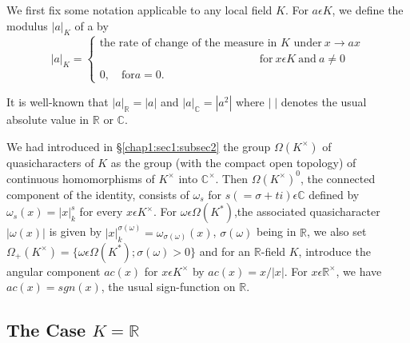 We first fix some notation applicable to any local field $K$. For
 $a\epsilon K$, we define the modulus $|a|_{K}$ of a by 
\begin{equation*}
  |a|_{K}=
  \begin{cases}
    \text{the  rate of change of the measure in $K$ under}~ x \rightarrow
    ax\\ 
    \hspace{6cm}\text{for}~ x\epsilon K ~\text{and}~ a\neq 0\\ 
    0,\quad  \text{for} a=0.
  \end{cases}
\end{equation*}

It is well-known that $|a|_{\mathbb{R}}=|a|$ and
$|a|_{\mathbb{C}}={|a^{2}|}$ where $|\;|$ denotes the usual absolute
value in $\mathbb{R}$ or $\mathbb{C}$. 

 We had introduced in \S \ref{chap1:sec1:subsec2} the group $\Omega(K^\times)$ of
 quasicharacters of $K$ as the group (with the compact open topology) of
 continuous homomorphisms of $K^\times$ into $\mathbb{C}^\times$. Then
 $\Omega(K^\times)^{0}$, the connected component of the identity,
 consists of $\omega_{s}$ for $s(=\sigma+ti)\epsilon \mathbb{C}$
 defined by $\omega_{s}(x)=|x|_{k}^{s}$ for every $x\epsilon
 K^\times$. For $\omega \epsilon \Omega(K^*)$,the associated
 quasicharacter $|\omega(x)|$ is given by
 $|x|_{k}^{\sigma(\omega)}=\omega_{\sigma(\omega)}(x)$, $\sigma(\omega)$
 being in $\mathbb{R}$, we also set $\Omega_{+}(K^\times)=\{\omega
   \epsilon \Omega(K^*); \sigma(\omega) > 0\}$ and for an
 $\mathbb{R}$-field $K$, introduce the angular component $ac(x)$ for
   $x\epsilon K^\times$ by $ac(x)=x/|x|$. For $x \epsilon \mathbb{R}^\times$,
   we have $ac(x)= sgn(x)$, the usual sign-function on $\mathbb{R}$.

\subsection{The Case $K=\mathbb{R}$}\label{chap1:sec4:subsec2} %

